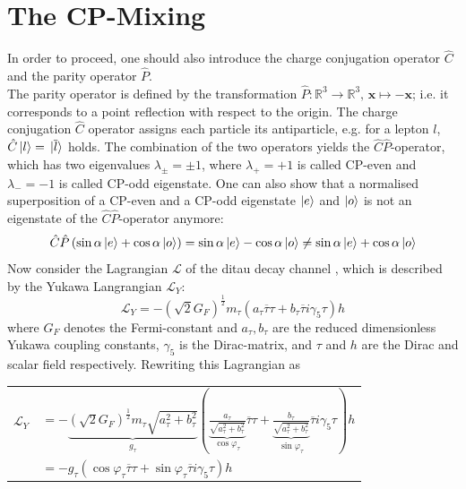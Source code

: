 \section{The CP-Mixing}
In order to proceed, one should also introduce the charge conjugation operator $\hat{C}$ and the parity operator $\hat{P}$. \\
The parity operator is defined by the transformation $\hat{P}: \mathbb{R}^3 \rightarrow \mathbb{R}^3, \, \boldsymbol{x} \mapsto -\boldsymbol{x}$; i.e. it corresponds to a point reflection with respect to the origin. The charge conjugation $\hat{C}$ operator assigns each particle its antiparticle, e.g. for a lepton $l$, $\hat{C}\ket{l} = \ket*{\overline{l}}$ holds. The combination of the two operators yields the $\hat{C}\hat{P}$-operator, which has two eigenvalues $\lambda_\pm=\pm 1$, where $\lambda_+=+1$ is called CP-even and $\lambda_-=-1$ is called CP-odd eigenstate. One can also show that a normalised superposition of a CP-even and a CP-odd eigenstate $\ket{e}$ and $\ket{o}$ is not an eigenstate of the $\hat{C}\hat{P}$-operator anymore:
\begin{equation}
	\hat{C}\hat{P} \left(\sin\alpha\ket{e}+\cos\alpha\ket{o}\right) = \sin\alpha\ket{e}-\cos\alpha\ket{o} \neq \sin\alpha\ket{e}+\cos\alpha\ket{o}
\end{equation}
Now consider the Lagrangian $\mathcal{L}$ of the ditau decay channel \parencite{Berge_DY_bckg}, which is described by the Yukawa Langrangian $\mathcal{L}_Y$:
\begin{equation}
	\mathcal{L}_Y = -\left(\sqrt{2} G_F\right)^\frac{1}{2} m_\tau (a_\tau \overline{\tau}\tau+b_\tau \overline{\tau}i\gamma_5\tau)h
\end{equation}
where $G_F$ denotes the Fermi-constant and $a_\tau, b_\tau$ are the reduced dimensionless Yukawa coupling constants, $\gamma_5$ is the Dirac-matrix, and $\tau$ and $h$ are the Dirac and scalar field respectively. Rewriting this Lagrangian as
\begin{center}
	\begin{tabular}{ll}
		$\mathcal{L}_Y $ & $= -\underbrace{\left(\sqrt{2} G_F\right)^\frac{1}{2} m_\tau\sqrt{a_\tau^2+b_\tau^2}}_\text{$g_\tau$} \left(\underbrace{\frac{a_\tau}{\sqrt{a_\tau^2+b_\tau^2}}}_\text{$\cos\varphi_\tau$} \overline{\tau}\tau+\underbrace{\frac{b_\tau}{\sqrt{a_\tau^2+b_\tau^2}}}_\text{$\sin\varphi_\tau$} \overline{\tau}i\gamma_5\tau\right)h$\\
		 & $= - g_\tau \left(\cos\varphi_\tau\overline{\tau}\tau+\sin\varphi_\tau\overline{\tau}i\gamma_5\tau\right)h$
	\end{tabular}
\end{center}
